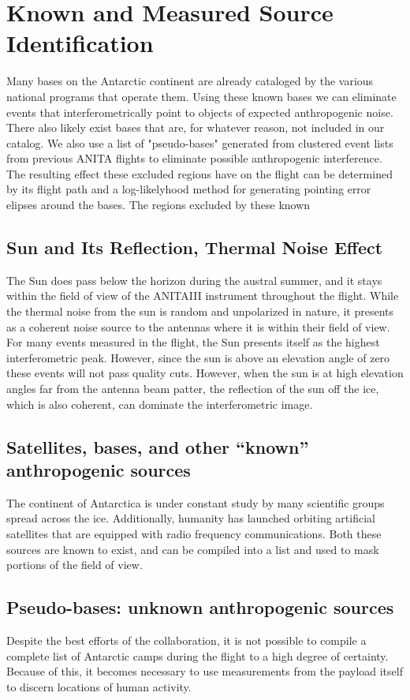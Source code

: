 \section{Known and Measured Source Identification}
	Many bases on the Antarctic continent are already cataloged by the various national programs that operate them.  Using these known bases we can eliminate events that interferometrically point to objects of expected anthropogenic noise.  There also likely exist bases that are, for whatever reason, not included in our catalog.  We also use a list of "pseudo-bases" generated from clustered event lists from previous ANITA flights to eliminate possible anthropogenic interference.  The resulting effect these excluded regions have on the flight can be determined by its flight path and a log-likelyhood method for generating pointing error elipses around the bases.  The regions excluded by these known 
	
	
	\subsection{Sun and Its Reflection, Thermal Noise Effect}
		The Sun does pass below the horizon during the austral summer, and it stays within the field of view of the ANITAIII instrument throughout the flight.  While the thermal noise from the sun is random and unpolarized in nature, it presents as a coherent noise source to the antennas where it is within their field of view.  For many events measured in the flight, the Sun presents itself as the highest interferometric peak.  However, since the sun is above an elevation angle of zero these events will not pass quality cuts. However, when the sun is at high elevation angles far from the antenna beam patter, the reflection of the sun off the ice, which is also coherent, can dominate the interferometric image.
	
	\subsection{Satellites, bases, and other ``known'' anthropogenic sources}
		The continent of Antarctica is under constant study by many scientific groups spread across the ice.  Additionally, humanity has launched orbiting artificial satellites that are equipped with radio frequency communications.  Both these sources are known to exist, and can be compiled into a list and used to mask portions of the field of view.  

	\subsection{Pseudo-bases: unknown anthropogenic sources}
		Despite the best efforts of the collaboration, it is not possible to compile a complete list of Antarctic camps during the flight to a high degree of certainty.  Because of this, it becomes necessary to use measurements from the payload itself to discern locations of human activity.  



